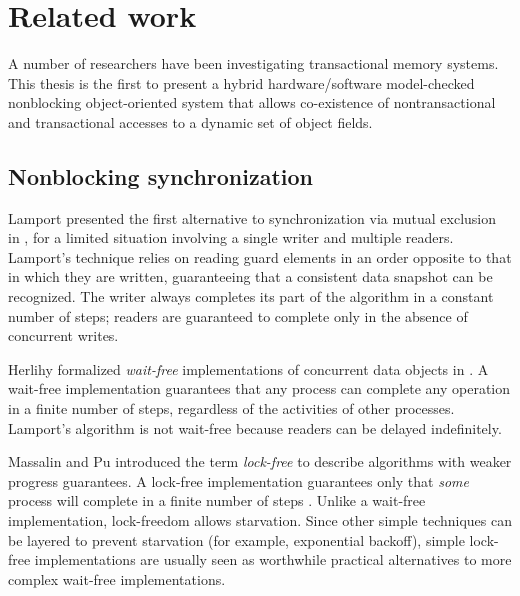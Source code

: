 \chapter{Related work}\label{cha:related}

A number of researchers have been investigating transactional memory
systems.  This thesis is the first to present a hybrid hardware/software
model-checked nonblocking
object-oriented system that allows co-existence of nontransactional and
transactional accesses to a dynamic set of object fields.

\section{Nonblocking synchronization}\label{sec:nb-sync}

Lamport presented the first alternative to synchronization via mutual
exclusion in \cite{Lamport77}, for a limited situation involving a single
writer and multiple readers.  Lamport's technique relies on reading
guard elements in an order opposite to that in which they are written,
guaranteeing that a consistent data snapshot can be recognized.  The
writer always completes its part of the algorithm in a constant number
of steps; readers are guaranteed to complete only in the absence of
concurrent writes.

Herlihy formalized \emph{wait-free} implementations of
concurrent data objects in \cite{Herlihy88}.  A wait-free implementation
guarantees that any process can complete any operation in a finite
number of steps, regardless of the activities of other processes.
Lamport's algorithm is not wait-free
because readers can be delayed indefinitely.

Massalin and Pu introduced the term \emph{lock-free} to describe 
algorithms with weaker progress guarantees.
A lock-free implementation guarantees only that \emph{some}
process will complete in a finite number of steps
\cite{MassalinPu91}.  Unlike a wait-free implementation,
lock-freedom allows starvation.  Since other simple techniques can be
layered to prevent starvation (for example, exponential backoff),
simple lock-free implementations are usually seen as worthwhile practical
alternatives to more complex wait-free implementations.

